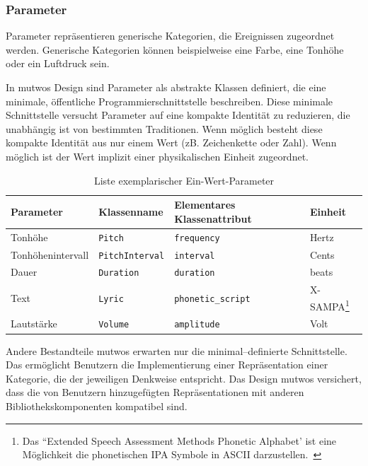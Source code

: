 \documentclass[12pt,a4paper,ngerman]{article}
\begin{document}
\subsubsection{Parameter}

Parameter repräsentieren generische Kategorien, die Ereignissen zugeordnet werden.
Generische Kategorien können beispielweise eine Farbe, eine Tonhöhe oder ein Luftdruck sein.

In mutwos Design sind Parameter als abstrakte Klassen definiert, die eine minimale, öffentliche Programmierschnittstelle beschreiben.
Diese minimale Schnittstelle versucht Parameter auf eine kompakte Identität zu reduzieren, die unabhängig ist von bestimmten Traditionen.
Wenn möglich besteht diese kompakte Identität aus nur einem Wert (zB. Zeichenkette oder Zahl).
Wenn möglich ist der Wert implizit einer physikalischen Einheit zugeordnet.

\begin{table}[h!]
    \begin{center}
        \begin{tabular}{l l l l} 
            \hline
            Parameter & Klassenname & Elementares Klassenattribut & Einheit \\ [0.5ex] 
            \hline\hline
            Tonhöhe & \texttt{Pitch} & \texttt{frequency} & Hertz \\ 
            Tonhöhenintervall & \texttt{PitchInterval} & \texttt{interval} & Cents \\ 
            Dauer & \texttt{Duration} & \texttt{duration} & beats \\ 
            Text & \texttt{Lyric} & \texttt{phonetic\_script} & X-SAMPA\footnote{%
                Das ``Extended Speech Assessment Methods Phonetic Alphabet' ist eine Möglichkeit die phonetischen IPA Symbole in ASCII darzustellen.~\cite{xsampaWikipedia}
            } \\ 
            Lautstärke & \texttt{Volume} & \texttt{amplitude} & Volt \\ [1ex] 
            \hline
        \end{tabular}
    \end{center}

    \caption{Liste exemplarischer Ein-Wert-Parameter}
\end{table}

Andere Bestandteile mutwos erwarten nur die minimal--definierte Schnittstelle.
Das ermöglicht Benutzern die Implementierung einer Repräsentation einer Kategorie, die der jeweiligen Denkweise entspricht.
Das Design mutwos versichert, dass die von Benutzern hinzugefügten Repräsentationen mit anderen Bibliothekskomponenten kompatibel sind.
\end{document}
